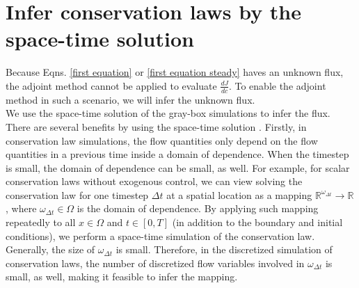 \documentclass[a4paper,onecolumn]{article}
\theoremstyle{remark}
\begin{document}
\section{Infer conservation laws by the space-time solution}
\label{infer}
\indent Because Eqns. \eqref{first equation} or \eqref{first equation steady}
haves an unknown flux, the adjoint method cannot be applied to evaluate 
$\frac{dJ}{dc}$. To enable the adjoint method in such a scenario, we will infer
the unknown flux.\\

\indent We use the space-time solution of the gray-box simulations 
to infer the flux.
There are several benefits by using the space-time solution \cite{hanmaster, ecmor}.
Firstly, in conservation law simulations, the flow quantities only depend on the flow
quantities in a previous time inside a domain of dependence.
When the timestep is small,
the domain of dependence can be small, as well. For example, for scalar conservation laws 
without exogenous control,
we can view solving the conservation law for one timestep $\Delta t$ at a spatial location
as a mapping 
$\mathbb{R}^{\omega_{\Delta t}} \rightarrow \mathbb{R}$, where $\omega_{\Delta t}\in \Omega$ 
is the domain of dependence. 
By applying such mapping repeatedly to all $x\in \Omega$ and $t\in[0,T]$
(in addition to the boundary and initial conditions), we perform 
a space-time simulation of the conservation law. 
Generally, the size of $\omega_{\Delta t}$ is small.
Therefore, in the discretized simulation of conservation laws,
the number of discretized flow variables involved in $\omega_{\Delta t}$ is small, as well,
making it feasible to infer the mapping.
\\
\end{document}
